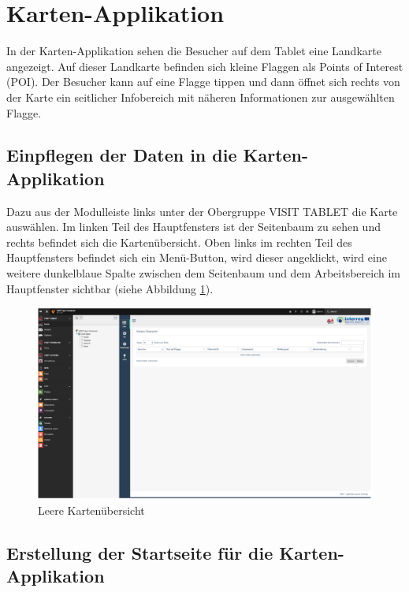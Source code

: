 \cleardoublepage

\section{Karten-Applikation}

In der Karten-Applikation sehen die Besucher auf dem Tablet eine Landkarte angezeigt. Auf dieser Landkarte befinden sich kleine Flaggen als Points of Interest (POI). Der Besucher kann auf eine Flagge tippen und dann öffnet sich rechts von der Karte ein seitlicher Infobereich mit näheren Informationen zur ausgewählten Flagge.

\subsection{Einpflegen der Daten in die Karten-Applikation}

Dazu aus der Modulleiste links unter der Obergruppe VISIT TABLET die Karte auswählen. Im linken Teil des Hauptfensters ist der Seitenbaum zu sehen und rechts befindet sich die Kartenübersicht. Oben links im rechten Teil des Hauptfensters befindet sich ein Menü-Button, wird dieser angeklickt, wird eine weitere dunkelblaue Spalte zwischen dem Seitenbaum und dem Arbeitsbereich im Hauptfenster sichtbar (siehe Abbildung \ref{img:kartenapp}).

\begin{figure}[ht!]
\centering
\includegraphics[width=12cm]{Figures/paula/karte/kartenapp.png}
\caption{Leere Kartenübersicht}
\label{img:kartenapp}
\end{figure}

\subsection{Erstellung der Startseite für die Karten-Applikation}

